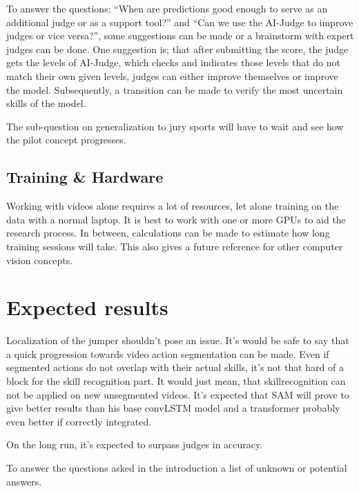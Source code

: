 
To answer the questions; ``When are predictions good enough to serve as an additional judge or as a support tool?'' and ``Can we use the AI-Judge to improve judges or vice versa?'', some suggestions can be made or a brainstorm with expert judges can be done. One suggestion is; that after submitting the score, the judge gets the levels of AI-Judge, which checks and indicates those levels that do not match their own given levels, judges can either improve themselves or improve the model. Subsequently, a transition can be made to verify the most uncertain skills of the model.

The sub-question on generalization to jury sports will have to wait and see how the pilot concept progresses.

\subsection{Training \& Hardware}

Working with videos alone requires a lot of resources, let alone training on the data with a normal laptop. It is best to work with one or more GPUs to aid the research process. In between, calculations can be made to estimate how long training sessions will take. This also gives a future reference for other computer vision concepts.


\section{Expected results}
\label{sec:verwachte-resultaten}

Localization of the jumper shouldn't pose an issue. It's would be safe to say that a quick progression towards video action segmentation can be made. Even if segmented actions do not overlap with their actual skills, it's not that hard of a block for the skill recognition part. It would just mean, that skillrecognition can not be applied on new unsegmented videos.
It's expected that SAM will prove to give better results than his base convLSTM model and a transformer probably even better if correctly integrated.

On the long run, it's expected to surpass judges in accuracy.

To answer the questions asked in the introduction a list of unknown or potential answers.

